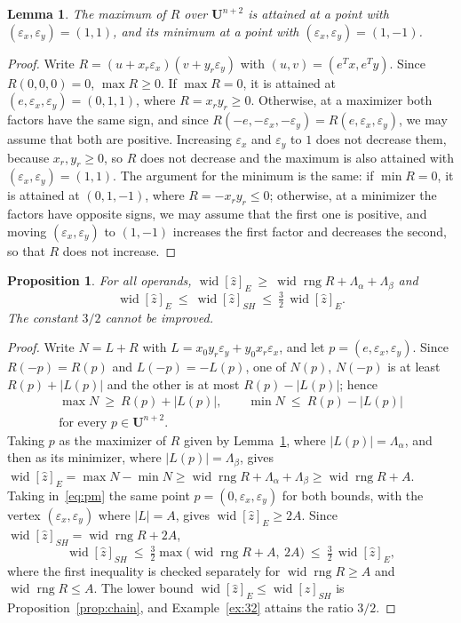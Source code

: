 \documentclass[10pt]{article}
\newtheorem{propo}[theorem]{Proposition}
\newtheorem{lemma}[theorem]{Lemma}
\theoremstyle{definition}
\newcommand{\U}{\mathbf{U}}
\newcommand{\eps}{\varepsilon}
\newcommand{\ex}{\eps_x}
\newcommand{\ey}{\eps_y}
\newcommand{\rng}{\operatorname{rng}}
\newcommand{\wid}{\operatorname{wid}}
\begin{document}
\begin{lemma}
\label{lem:classes}
The maximum of $R$ over $\U^{n+2}$ is attained at a point with $(\ex,\ey)=(1,1)$, and its minimum at a point with $(\ex,\ey)=(1,-1)$.
\end{lemma}
\begin{proof}
Write $R=(u+x_r\ex)(v+y_r\ey)$ with $(u,v)=(e^Tx,e^Ty)$. Since $R(0,0,0)=0$, $\max R\ge0$. If $\max R=0$, it is attained at $(e,\ex,\ey)=(0,1,1)$, where $R=x_ry_r\ge0$. Otherwise, at a maximizer both factors have the same sign, and since $R(-e,-\ex,-\ey)=R(e,\ex,\ey)$, we may assume that both are positive. Increasing $\ex$ and $\ey$ to $1$ does not decrease them, because $x_r,y_r\ge0$, so $R$ does not decrease and the maximum is also attained with $(\ex,\ey)=(1,1)$. The argument for the minimum is the same: if $\min R=0$, it is attained at $(0,1,-1)$, where $R=-x_ry_r\le0$; otherwise, at a minimizer the factors have opposite signs, we may assume that the first one is positive, and moving $(\ex,\ey)$ to $(1,-1)$ increases the first factor and decreases the second, so that $R$ does not increase.
\end{proof}

\begin{propo}
\label{prop:32}
For all operands, $\wid[\hat z]_E\ \ge\ \wid\rng R+\Lambda_\alpha+\Lambda_\beta$ and
\[
\wid[\hat z]_E\ \le\ \wid[\hat z]_{SH}\ \le\ \tfrac32\,\wid[\hat z]_E .
\]
The constant $3/2$ cannot be improved.
\end{propo}
\begin{proof}
Write $N=L+R$ with $L=x_0y_r\ey+y_0x_r\ex$, and let $p=(e,\ex,\ey)$. Since $R(-p)=R(p)$ and $L(-p)=-L(p)$, one of $N(p)$, $N(-p)$ is at least $R(p)+|L(p)|$ and the other is at most $R(p)-|L(p)|$; hence
\begin{equation}
\label{eq:pm}
\begin{gathered}\max N\ \ge\ R(p)+|L(p)|,\qquad \min N\ \le\ R(p)-|L(p)|\\ \text{for every } p\in\U^{n+2}.\end{gathered}
\end{equation}
Taking $p$ as the maximizer of $R$ given by Lemma~\ref{lem:classes}, where $|L(p)|=\Lambda_\alpha$, and then as its minimizer, where $|L(p)|=\Lambda_\beta$, gives $\wid[\hat z]_E=\max N-\min N\ge\wid\rng R+\Lambda_\alpha+\Lambda_\beta\ge\wid\rng R+A$. Taking in~\eqref{eq:pm} the same point $p=(0,\ex,\ey)$ for both bounds, with the vertex $(\ex,\ey)$ where $|L|=A$, gives $\wid[\hat z]_E\ge 2A$. Since $\wid[\hat z]_{SH}=\wid\rng R+2A$,
\[
\wid[\hat z]_{SH}\ \le\ \tfrac32\max\big(\wid\rng R+A,\ 2A\big)\ \le\ \tfrac32\,\wid[\hat z]_E ,
\]
where the first inequality is checked separately for $\wid\rng R\ge A$ and $\wid\rng R\le A$. The lower bound $\wid[\hat z]_E\le\wid[\hat z]_{SH}$ is Proposition~\ref{prop:chain}, and Example~\ref{ex:32} attains the ratio $3/2$.
\end{proof}
\end{document}

